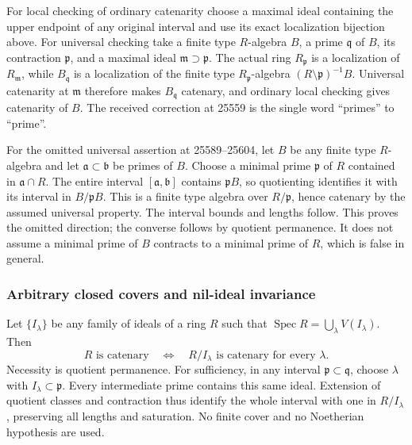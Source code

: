 For local checking of ordinary catenarity choose a maximal ideal containing the upper endpoint of any original interval and use its exact localization bijection above. For universal checking take a finite type \(R\)-algebra \(B\), a prime \(\mathfrak q\) of \(B\), its contraction \(\mathfrak p\), and a maximal ideal \(\mathfrak m\supset\mathfrak p\). The actual ring \(R_{\mathfrak p}\) is a localization of \(R_{\mathfrak m}\), while \(B_{\mathfrak q}\) is a localization of the finite type \(R_{\mathfrak p}\)-algebra \((R\setminus\mathfrak p)^{-1}B\). Universal catenarity at \(\mathfrak m\) therefore makes \(B_{\mathfrak q}\) catenary, and ordinary local checking gives catenarity of \(B\). The received correction at 25559 is the single word ``primes'' to ``prime''.

For the omitted universal assertion at 25589--25604, let \(B\) be any finite type \(R\)-algebra and let \(\mathfrak a\subset\mathfrak b\) be primes of \(B\). Choose a minimal prime \(\mathfrak p\) of \(R\) contained in \(\mathfrak a\cap R\). The entire interval \([\mathfrak a,\mathfrak b]\) contains \(\mathfrak pB\), so quotienting identifies it with its interval in \(B/\mathfrak pB\). This is a finite type algebra over \(R/\mathfrak p\), hence catenary by the assumed universal property. The interval bounds and lengths follow. This proves the omitted direction; the converse follows by quotient permanence. It does not assume a minimal prime of \(B\) contracts to a minimal prime of \(R\), which is false in general.

\subsubsection{Arbitrary closed covers and nil-ideal invariance}\label{algebra-proof-020-arbitrary-closed-covers-and-nil-ideal-invariance}

Let \(\{I_\lambda\}\) be any family of ideals of a ring \(R\) such that \(\operatorname{Spec}R=\bigcup_\lambda V(I_\lambda)\). Then \[
 R\text{ is catenary}\quad\Longleftrightarrow\quad
 R/I_\lambda\text{ is catenary for every }\lambda.
\] Necessity is quotient permanence. For sufficiency, in any interval \(\mathfrak p\subset\mathfrak q\), choose \(\lambda\) with \(I_\lambda\subset
\mathfrak p\). Every intermediate prime contains this same ideal. Extension of quotient classes and contraction thus identify the whole interval with one in \(R/I_\lambda\), preserving all lengths and saturation. No finite cover and no Noetherian hypothesis are used.

